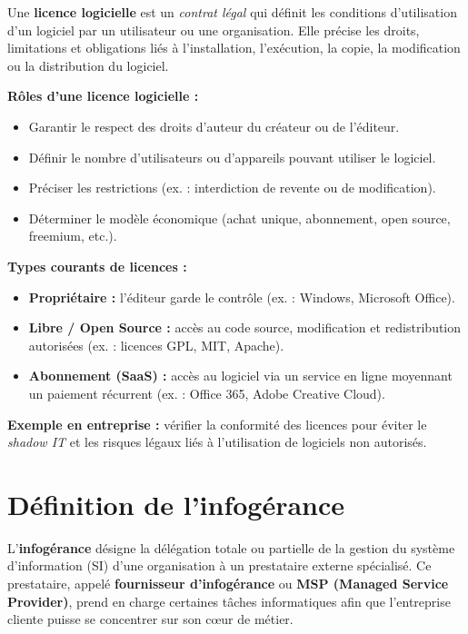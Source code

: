 \documentclass[a4paper,11pt]{article}
\begin{document}
\begin{tcolorbox}[colback=orange!5,colframe=orange!60!black,title=Qu'est-ce qu'une licence logicielle ?]

Une \textbf{licence logicielle} est un \textit{contrat légal} qui définit les conditions d’utilisation 
d’un logiciel par un utilisateur ou une organisation.  
Elle précise les droits, limitations et obligations liés à l’installation, l’exécution, la copie, la 
modification ou la distribution du logiciel.  

\medskip
\textbf{Rôles d’une licence logicielle :}
\begin{itemize}
  \item Garantir le respect des droits d’auteur du créateur ou de l’éditeur.
  \item Définir le nombre d’utilisateurs ou d’appareils pouvant utiliser le logiciel.
  \item Préciser les restrictions (ex. : interdiction de revente ou de modification).
  \item Déterminer le modèle économique (achat unique, abonnement, open source, freemium, etc.).
\end{itemize}

\medskip
\textbf{Types courants de licences :}
\begin{itemize}
  \item \textbf{Propriétaire :} l’éditeur garde le contrôle (ex. : Windows, Microsoft Office).
  \item \textbf{Libre / Open Source :} accès au code source, modification et redistribution autorisées 
        (ex. : licences GPL, MIT, Apache).
  \item \textbf{Abonnement (SaaS) :} accès au logiciel via un service en ligne moyennant un paiement récurrent (ex. : Office 365, Adobe Creative Cloud).
\end{itemize}

\medskip
\textbf{Exemple en entreprise :} vérifier la conformité des licences pour éviter le \textit{shadow IT} 
et les risques légaux liés à l’utilisation de logiciels non autorisés.
\end{tcolorbox}


\section*{Définition de l’infogérance}

\begin{tcolorbox}[title={Infogérance}]
L’\textbf{infogérance} désigne la délégation totale ou partielle de la gestion du système d’information (SI) d’une organisation à un prestataire externe spécialisé.  
Ce prestataire, appelé \textbf{fournisseur d’infogérance} ou \textbf{MSP (Managed Service Provider)}, prend en charge certaines tâches informatiques afin que l’entreprise cliente puisse se concentrer sur son cœur de métier.
\end{tcolorbox}
\end{document}
